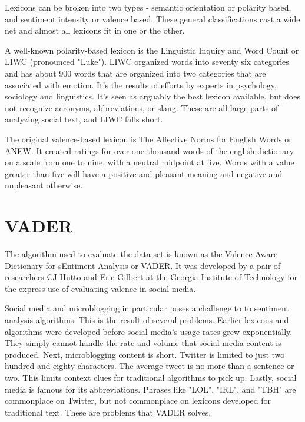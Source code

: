 \documentclass[11pt, twoside, reqno]{article}
\begin{document}
Lexicons can be broken into two types - semantic orientation or polarity based, and sentiment intensity or valence based. These general classifications cast a wide net and almost all lexicons fit in one or the other. 

 A well-known polarity-based lexicon is the Linguistic Inquiry and Word Count or LIWC (pronounced "Luke"). LIWC organized words into seventy six categories and has about 900 words that are organized into two categories that are associated with emotion. It's the results of efforts by experts in psychology, sociology and linguistics. It's seen as arguably the best lexicon available, but does not recognize acronyms, abbreviations, or slang. These are all large parts of analyzing social text, and LIWC falls short. 

The original valence-based lexicon is The Affective Norms for English Words or ANEW. It created ratings for over one thousand words of the english dictionary on a scale from one to nine, with a neutral midpoint at five. Words with a value greater than five will have a positive and pleasant meaning and negative and unpleasant otherwise. 

\section{VADER}
\hspace{0.2in}The algorithm used to evaluate the data set is known as the Valence Aware Dictionary for sEntiment Analysis or VADER. It was developed by a pair of researchers CJ Hutto and Eric Gilbert at the Georgia Institute of Technology for the express use of evaluating valence in social media. 

Social media and microblogging in particular poses a challenge to to sentiment analysis algorithms. This is the result of several problems. Earlier lexicons and algorithms were developed before social media's usage rates grew exponentially. They simply cannot handle the rate and volume that social media content is produced. Next, microblogging content is short. Twitter is limited to just two hundred and eighty characters. The average tweet is no more than a sentence or two. This limits context clues for traditional algorithms to pick up. Lastly, social media is famous for its abbreviations. Phrases like "LOL", "IRL", and "TBH" are commonplace on Twitter, but not commonplace on lexicons developed for traditional text. These are problems that VADER solves.
 
\end{document}
